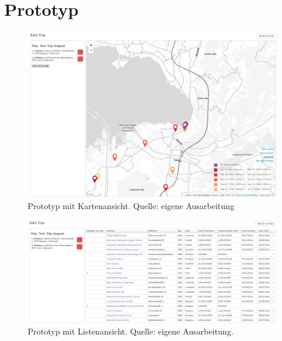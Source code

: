 \documentclass[Bachelorarbeit.tex]{subfiles}
\begin{document}
\chapter{Prototyp}
\label{bilderPrototyp}

\begin{figure}[h]
\centering
\includegraphics[width=1\linewidth]{img/Prototyp/mapView}
\caption[Prototyp mit Kartenansicht]{Prototyp mit Kartenansicht. Quelle: eigene Ausarbeitung}
\label{fig:mapView}
\end{figure}

\begin{figure}[h]
\centering
\includegraphics[width=1\linewidth]{img/Prototyp/listView}
\caption[Prototyp mit Listenansicht]{Prototyp mit Listenansicht. Quelle: eigene Ausarbeitung.}
\label{fig:listView}
\end{figure}

\end{document}
